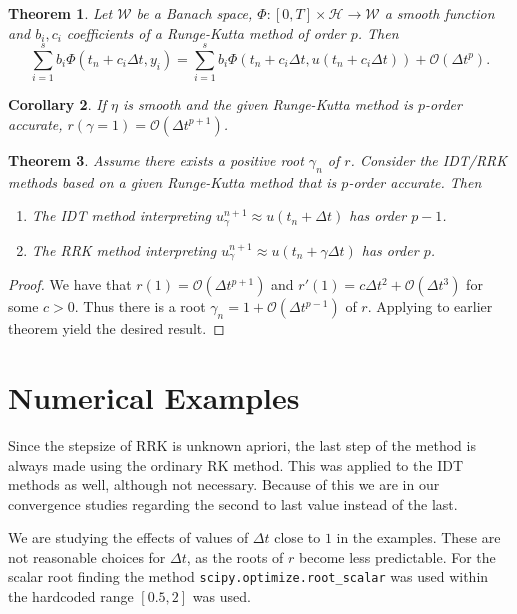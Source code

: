 \documentclass{report}
\newtheorem{theorem}{Theorem}[section]
\newtheorem{corollary}[theorem]{Corollary}
\renewcommand{\Phi}{\varPhi}
\begin{document}
    \begin{theorem}
        Let \(\mathcal{W}\) be a Banach space, \(\Phi: \left[0,T\right]\times \mathcal{H} \rightarrow \mathcal{W}\) a smooth function and \(b_i, c_i\) coefficients of a Runge-Kutta method of order \(p\). Then
        \[\sum_{i=1}^s b_i\Phi(t_n + c_i \Delta t, y_i) = \sum_{i=1}^{s}b_i\Phi(t_n + c_i \Delta t, u(t_n + c_i \Delta t)) + \mathcal{O}(\Delta t^p).\]
    \end{theorem}
    \begin{corollary}
        If \(\eta\) is smooth and the given Runge-Kutta method is \(p\)-order accurate, \(r(\gamma = 1) = \mathcal{O}(\Delta t^{p+1})\).
    \end{corollary}


    \begin{theorem}
        Assume there exists a positive root \(\gamma_n\) of \(r\). Consider the IDT/RRK methods based on a given Runge-Kutta method that is \(p\)-order accurate. Then
        \begin{enumerate}
            \item The IDT method interpreting \(u_{\gamma}^{n+1} \approx u(t_n + \Delta t)\) has order \(p-1\).
            \item The RRK method interpreting \(u_{\gamma}^{n+1} \approx u(t_n + \gamma \Delta t)\) has order \(p\).
        \end{enumerate}
    \end{theorem}
    \begin{proof}
        We have that \(r(1) = \mathcal{O}(\Delta t^{p+1})\) and \(r'(1)=c\Delta t^2 + \mathcal{O}(\Delta t^{3})\) for some \(c>0\). Thus there is a root \(\gamma_n = 1 + \mathcal{O}(\Delta t^{p-1})\) of \(r\). Applying to earlier theorem yield the desired result.
    \end{proof}


\chapter{Numerical Examples}

    Since the stepsize of RRK is unknown apriori, the last step of the method is always made using the ordinary RK method. This was applied to the IDT methods as well, although not necessary.
    Because of this we are in our convergence studies regarding the second to last value instead of the last.

    \vspace*{5mm}
    We are studying the effects of values of \(\Delta t\) close to \(1\) in the examples. These are not reasonable choices for \(\Delta t\), as the roots of \(r\) become less predictable. For the scalar root finding the method \texttt{scipy.optimize.root\_scalar} was used within the hardcoded range \( \left[0.5,2\right] \) was used.
\end{document}
